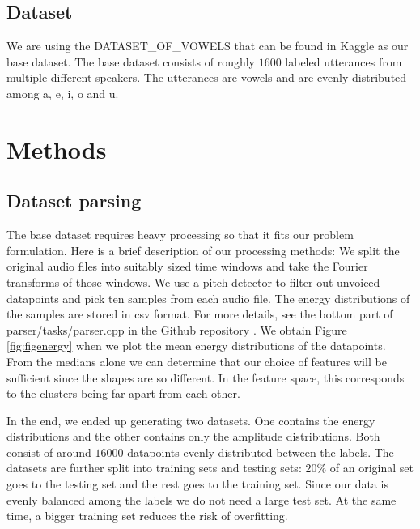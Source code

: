 \documentclass[letterpaper,12pt]{article}
\begin{document}
\subsection{Dataset}

We are using the DATASET\_OF\_VOWELS that can be found in Kaggle\cite{dataset} as our base dataset. The base dataset consists of roughly $1600$ labeled utterances from multiple different speakers. The utterances are vowels and are evenly distributed among a, e, i, o and u.

\section{Methods}\label{sec:methods}

\subsection{Dataset parsing}

The base dataset requires heavy processing so that it fits our problem formulation. Here is a brief description of our processing methods: We split the original audio files into suitably sized time windows and take the Fourier transforms of those windows. We use a pitch detector to filter out unvoiced datapoints and pick ten samples from each audio file. The energy distributions of the samples are stored in csv format. For more details, see the bottom part of parser/tasks/parser.cpp in the Github repository \cite{repo}. We obtain Figure \ref{fig:figenergy} when we plot the mean energy distributions of the datapoints. From the medians alone we can determine that our choice of features will be sufficient since the shapes are so different. In the feature space, this corresponds to the clusters being far apart from each other.

In the end, we ended up generating two datasets. One contains the energy distributions and the other contains only the amplitude distributions. Both consist of around $16000$ datapoints evenly distributed between the labels. The datasets are further split into training sets and testing sets: $20\%$ of an original set goes to the testing set and the rest goes to the training set. Since our data is evenly balanced among the labels we do not need a large test set. At the same time, a bigger training set reduces the risk of overfitting.
\end{document}
